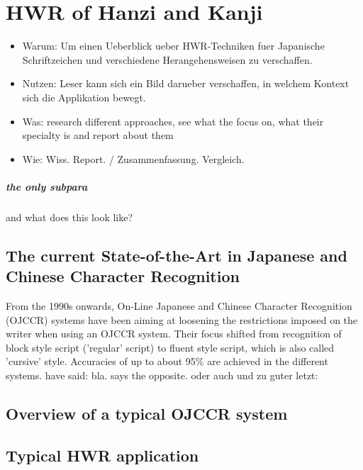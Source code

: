 \section{HWR of Hanzi and Kanji}
\begin{itemize}
\item Warum: Um einen Ueberblick ueber HWR-Techniken fuer Japanische 
  Schriftzeichen und verschiedene Herangehensweisen zu verschaffen.
\item Nutzen: Leser kann sich ein Bild darueber verschaffen,
  in welchem Kontext sich die Applikation bewegt.
\item Was: research different approaches, see what the focus on, 
  what their specialty is and report about them
\item Wie: Wiss. Report. / Zusammenfassung. Vergleich.
\end{itemize}

\subparagraph{the only subpara}

and what does this look like?

\subsection{The current State-of-the-Art in Japanese and Chinese Character Recognition}
From the 1990s onwards, On-Line Japanese and Chinese Character Recognition 
(OJCCR) systems have been aiming at loosening the restrictions imposed on 
the writer when using an OJCCR system. Their focus shifted from recognition 
of block style script ('regular' script) to fluent style script, 
which is also called 'cursive' style. Accuracies of up to about 95\% are
achieved in the different systems. \cite{LiuJaegerNakagawa2004} have said: 
bla.  says the opposite. \cite{ChenLee1996} oder auch 
\cite{Nakagawa2008} und \cite{Nakai2003} zu guter letzt: \cite{Santosh2009}

\subsection{Overview of a typical OJCCR system}

\subsection{Typical HWR application}

